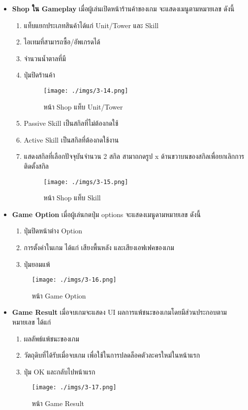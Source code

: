 \documentclass[12pt,oneside,openright,a4paper]{cpe-thai-project}
\begin{document}
\begin{itemize}
  \item \textbf{Shop ใน Gameplay} เมื่อผู้เล่นเปิดหน้าร้านค้าของเกม จะแสดงเมนูตามหมายเลข ดังนี้
  \begin{enumerate}
    \item แท็บแยกประเภทสินค้าได้แก่ Unit/Tower และ Skill
    \item ไอเทมที่สามารถซื้อ/อัพเกรดได้
    \item จำนวนน้ำตาลที่มี
    \item ปุ่มปิดร้านค้า
    
    \begin{figure}[H]\centering
      \texttt{[image: ./imgs/3-14.png]}
      \caption{หน้า Shop แท็บ Unit/Tower}\label{fig:3-14}
    \end{figure}

\pagebreak
    \item Passive Skill เป็นสกิลที่ไม่ต้องกดใช้
    \item Active Skill เป็นสกิลที่ต้องกดใช้งาน
    \item แสดงสกิลที่เลือกปัจจุบันจำนวน 2 สกิล สามาถกดรูป x 
    ด้านขวาบนของสกิลเพื่อยกเลิกการติดตั้งสกิล

    \begin{figure}[H]\centering
      \texttt{[image: ./imgs/3-15.png]}
      \caption{หน้า Shop แท็บ Skill}\label{fig:3-15}
    \end{figure}

  \end{enumerate}
  

  \item \textbf{Game Option} เมื่อผู้เล่นกดปุ่ม options จะแสดงเมนูดามหมายเลข ดังนี้
  \begin{enumerate}
    \item ปุ่มปิดหน้าต่าง Option
    \item การตั้งค่าในเกม ได้แก่ เสียงพื้นหลัง และเสียงเอฟเฟคของเกม
    \item ปุ่มยอมแพ้
  \end{enumerate}

  \begin{figure}[H]\centering
    \texttt{[image: ./imgs/3-16.png]}
    \caption{หน้า Game Option}\label{fig:3-16}
  \end{figure}
  
  \pagebreak
  \item \textbf{Game Result}
  เมื่อจบเกมจะแสดง UI ผลการแพ้ชนะของเกมโดยมีส่วนประกอบตามหมายเลข ได้แก่
  \begin{enumerate}
    \item ผลลัพธ์แพ้ชนะของเกม
    \item วัตถุดิบที่ได้รับเมื่อจบเกม เพื่อใช้ในการปลดล็อคตัวละครใหม่ในหน้าแรก
    \item ปุ่ม OK และกลับไปหน้าแรก
  \end{enumerate}
  
  \begin{figure}[H]\centering
    \texttt{[image: ./imgs/3-17.png]}
    \caption{หน้า Game Result}\label{fig:3-17}
  \end{figure}
\end{itemize}
\end{document}
